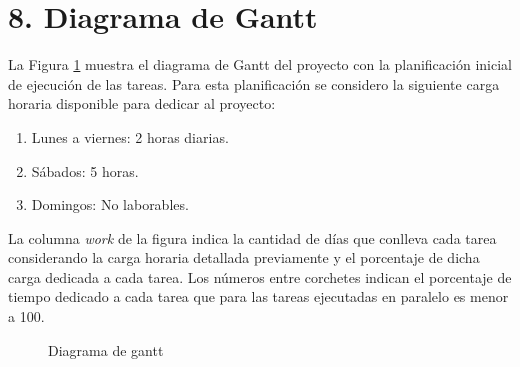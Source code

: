 \documentclass[11pt]{charter}
\begin{document}
\newpage
\section{8. Diagrama de Gantt}
\label{sec:gantt}

La Figura \ref{fig:DiagGantt} muestra el diagrama de Gantt del proyecto con la planificación inicial de ejecución de las tareas. Para esta planificación se considero la siguiente carga horaria disponible para dedicar al proyecto:
\begin{enumerate}
	\item Lunes a viernes: 2 horas diarias. 
	\item Sábados: 5 horas.
	\item Domingos: No laborables.
\end{enumerate}	
La columna \textit{work} de la figura indica la cantidad de días que conlleva cada tarea considerando la carga horaria detallada previamente y el porcentaje de dicha carga dedicada a cada tarea. Los números entre corchetes indican el porcentaje de tiempo dedicado a cada tarea que para las tareas ejecutadas en paralelo es menor a 100.
\begin{figure}[htpb]
\centering 
{}
\caption{Diagrama de gantt}
\label{fig:DiagGantt}
\end{figure}
\end{document}
